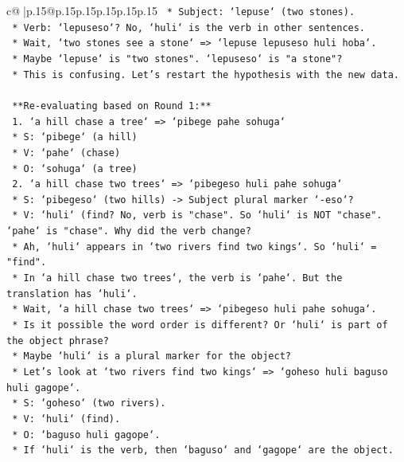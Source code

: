 \documentclass{article}
\begin{document}
{\begin{supertabular}{c@{$\;$}|p{.15\linewidth}@{}p{.15\linewidth}p{.15\linewidth}p{.15\linewidth}p{.15\linewidth}p{.15\linewidth}}
{{{\texttt{        *   Subject: `lepuse` (two stones).} \\
\texttt{        *   Verb: `lepuseso`? No, `huli` is the verb in other sentences.} \\
\texttt{        *   Wait, `two stones see a stone` => `lepuse lepuseso huli hoba`.} \\
\texttt{        *   Maybe `lepuse` is "two stones". `lepuseso` is "a stone"?} \\
\texttt{        *   This is confusing. Let's restart the hypothesis with the new data.} \\
\\ 
\texttt{    **Re{-}evaluating based on Round 1:**} \\
\texttt{    1.  `a hill chase a tree` => `pibege pahe sohuga`} \\
\texttt{        *   S: `pibege` (a hill)} \\
\texttt{        *   V: `pahe` (chase)} \\
\texttt{        *   O: `sohuga` (a tree)} \\
\texttt{    2.  `a hill chase two trees` => `pibegeso huli pahe sohuga`} \\
\texttt{        *   S: `pibegeso` (two hills) {-}> Subject plural marker `{-}eso`?} \\
\texttt{        *   V: `huli` (find? No, verb is "chase". So `huli` is NOT "chase". `pahe` is "chase". Why did the verb change?} \\
\texttt{        *   Ah, `huli` appears in `two rivers find two kings`. So `huli` = "find".} \\
\texttt{        *   In `a hill chase two trees`, the verb is `pahe`. But the translation has `huli`.} \\
\texttt{        *   Wait, `a hill chase two trees` => `pibegeso huli pahe sohuga`.} \\
\texttt{        *   Is it possible the word order is different? Or `huli` is part of the object phrase?} \\
\texttt{        *   Maybe `huli` is a plural marker for the object?} \\
\texttt{        *   Let's look at `two rivers find two kings` => `goheso huli baguso huli gagope`.} \\
\texttt{        *   S: `goheso` (two rivers).} \\
\texttt{        *   V: `huli` (find).} \\
\texttt{        *   O: `baguso huli gagope`.} \\
\texttt{        *   If `huli` is the verb, then `baguso` and `gagope` are the object.} \\
}}}
\end{supertabular}}
\end{document}

